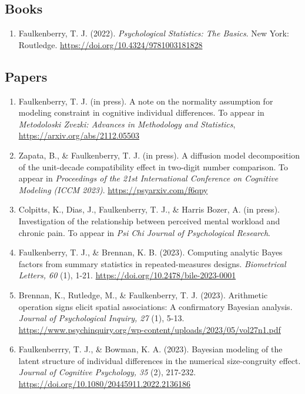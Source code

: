 \documentclass[article,10pt]{article}
\begin{document}
\subsection*{Books}
\label{sec:orga7f4da2}
\begin{enumerate}
\item Faulkenberry, T. J. (2022). \emph{Psychological Statistics: The Basics}. New York: Routledge. \url{https://doi.org/10.4324/9781003181828}
\end{enumerate}

\subsection*{Papers}
\label{sec:orgc527b91}
\begin{enumerate}
\item Faulkenberry, T. J. (in press). A note on the normality assumption for modeling constraint in cognitive individual differences. To appear in \emph{Metodoloski Zvezki: Advances in Methodology and Statistics}, \url{https://arxiv.org/abs/2112.05503}
\item Zapata, B., \& Faulkenberry, T. J. (in press). A diffusion model decomposition of the unit-decade compatibility effect in two-digit number comparison. To appear in \emph{Proceedings of the 21st International Conference on Cognitive Modeling (ICCM 2023)}. \url{https://psyarxiv.com/f6qpy}
\item Colpitts, K., Dias, J., Faulkenberry, T. J., \& Harris Bozer, A. (in press). Investigation of the relationship between perceived mental workload and chronic pain. To appear in \emph{Psi Chi Journal of Psychological Research}.
\item Faulkenberry, T. J., \& Brennan, K. B. (2023). Computing analytic Bayes factors from summary statistics in repeated-measures designs. \emph{Biometrical Letters, 60} (1), 1-21. \url{https://doi.org/10.2478/bile-2023-0001}
\item Brennan, K., Rutledge, M., \& Faulkenberry, T. J. (2023). Arithmetic operation signs elicit spatial associations: A confirmatory Bayesian analysis. \emph{Journal of Psychological Inquiry, 27} (1), 5-13. \url{https://www.psychinquiry.org/wp-content/uploads/2023/05/vol27n1.pdf}
\item Faulkenberrry, T. J., \& Bowman, K. A. (2023). Bayesian modeling of the latent structure of individual differences in the numerical size-congruity effect. \emph{Journal of Cognitive Psychology, 35} (2), 217-232. \url{https://doi.org/10.1080/20445911.2022.2136186}

\end{enumerate}
\end{document}
